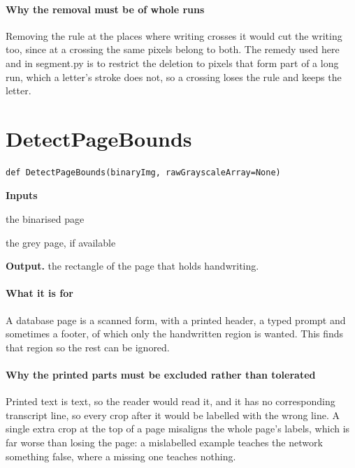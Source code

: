 \paragraph{Why the removal must be of whole runs}
Removing the rule at the places where writing crosses it would cut the writing too, since at a crossing the same pixels belong to both. The remedy used here and in segment.py is to restrict the deletion to pixels that form part of a long run, which a letter's stroke does not, so a crossing loses the rule and keeps the letter.


\section{DetectPageBounds}
\begin{lstlisting}[style=sig]
def DetectPageBounds(binaryImg, rawGrayscaleArray=None)
\end{lstlisting}

\noindent\textbf{Inputs}
\begin{description}[leftmargin=2.2em,style=nextline,font=\normalfont\ttfamily]\setlength\itemsep{1pt}
  \item[{binaryImg}] \normalfont the binarised page
  \item[{rawGrayscaleArray}] \normalfont the grey page, if available
\end{description}

\noindent\textbf{Output.} the rectangle of the page that holds handwriting.


\paragraph{What it is for}
A database page is a scanned form, with a printed header, a typed prompt and sometimes a footer, of which only the handwritten region is wanted. This finds that region so the rest can be ignored.


\paragraph{Why the printed parts must be excluded rather than tolerated}
Printed text is text, so the reader would read it, and it has no corresponding transcript line, so every crop after it would be labelled with the wrong line. A single extra crop at the top of a page misaligns the whole page's labels, which is far worse than losing the page: a mislabelled example teaches the network something false, where a missing one teaches nothing.


